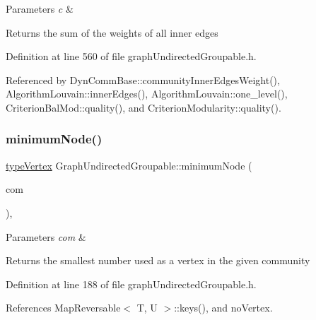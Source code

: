 \begin{DoxyParams}{Parameters}
{\em c} & \\
\hline
\end{DoxyParams}
\begin{DoxyReturn}{Returns}
the sum of the weights of all inner edges 
\end{DoxyReturn}


Definition at line 560 of file graph\+Undirected\+Groupable.\+h.



Referenced by Dyn\+Comm\+Base\+::community\+Inner\+Edges\+Weight(), Algorithm\+Louvain\+::inner\+Edges(), Algorithm\+Louvain\+::one\+\_\+level(), Criterion\+Bal\+Mod\+::quality(), and Criterion\+Modularity\+::quality().

\mbox{\label{classGraphUndirectedGroupable_a0ce165b4c68150f60ccd1977b83f3eb3}} 
\subsubsection{\texorpdfstring{minimum\+Node()}{minimumNode()}}
{\footnotesize\ttfamily \hyperlink{edge_8h_a5fbd20c46956d479cb10afc9855223f6}{type\+Vertex} Graph\+Undirected\+Groupable\+::minimum\+Node (\begin{DoxyParamCaption}\item[{const \hyperlink{graphUndirectedGroupable_8h_a914da95c9ea7f14f4b7f875c36818556}{type\+Community} \&}]{com }\end{DoxyParamCaption})\hspace{0.3cm}{\ttfamily [inline]}, {\ttfamily [private]}}


\begin{DoxyParams}{Parameters}
{\em com} & \\
\hline
\end{DoxyParams}
\begin{DoxyReturn}{Returns}
the smallest number used as a vertex in the given community 
\end{DoxyReturn}


Definition at line 188 of file graph\+Undirected\+Groupable.\+h.



References Map\+Reversable$<$ T, U $>$\+::keys(), and no\+Vertex.



